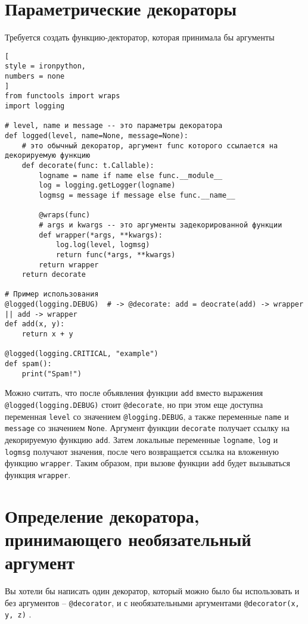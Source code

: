 \documentclass[%
	11pt,
	a4paper,
	utf8,
		]{article}
\begin{document}
\section{Параметрические декораторы}

Требуется создать функцию-декторатор, которая принимала бы аргументы
\begin{lstlisting}[
style = ironpython,
numbers = none
]
from functools import wraps
import logging

# level, name и message -- это параметры декоратора
def logged(level, name=None, message=None):
    # это обычный декоратор, аргумент func которого ссылается на декорируемую функцию
    def decorate(func: t.Callable):
        logname = name if name else func.__module__
        log = logging.getLogger(logname)
        logmsg = message if message else func.__name__
        
        @wraps(func)
        # args и kwargs -- это аргументы задекорированной функции
        def wrapper(*args, **kwargs):
            log.log(level, logmsg)
            return func(*args, **kwargs)
        return wrapper
    return decorate
    
# Пример использования
@logged(logging.DEBUG)  # -> @decorate: add = deocrate(add) -> wrapper || add -> wrapper
def add(x, y):
    return x + y
    
@logged(logging.CRITICAL, "example")
def spam():
    print("Spam!")
\end{lstlisting}

Можно считать, что после объявления функции \texttt{add} вместо выражения \verb|@logged(logging.DEBUG)| стоит \verb|@decorate|, но при этом еще доступна переменная \verb|level| со значением \verb|@logging.DEBUG|, а также переменные \texttt{name} и \texttt{message} со значением \texttt{None}. Аргумент функции \texttt{decorate} получает ссылку на декорируемую функцию \texttt{add}. Затем локальные переменные \texttt{logname}, \texttt{log} и \texttt{logmsg} получают значения, после чего возвращается ссылка на вложенную функцию \texttt{wrapper}. Таким образом, при вызове функции \texttt{add} будет вызываться функция \texttt{wrapper}.

\section{Определение декоратора, принимающего необязательный аргумент}

Вы хотели бы написать один декоратор, который можно было бы использовать и без аргументов -- \verb|@decorator|, и с необязательными аргументами \verb|@decorator(x, y, z)| \cite[]{beazley:python_cookbook-2019}.
\end{document}
